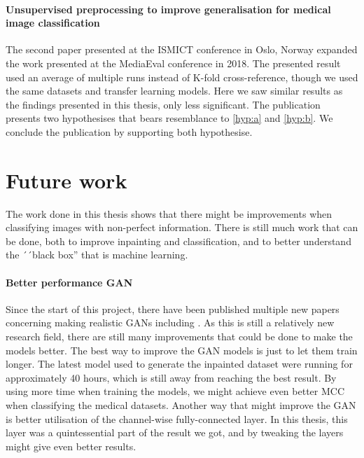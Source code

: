 \paragraph{Unsupervised preprocessing to improve generalisation for medical image classification~\cite{Mathias2019IEEpaper}}
The second paper presented at the ISMICT conference in Oslo, Norway expanded the work presented at the MediaEval conference in 2018.
The presented result used an average of multiple runs instead of K-fold cross-reference, though we used the same datasets and transfer learning models.
Here we saw similar results as the findings presented in this thesis, only less significant. The publication presents two hypothesises that bears resemblance to \ref{hyp:a} and \ref{hyp:b}. We conclude the publication by supporting both hypothesise.








\section{Future work}
The work done in this thesis shows that there might be improvements when classifying images with non-perfect information. There is still much work that can be done, both to improve inpainting and classification, and to better understand the ´´black box'' that is machine learning. 

\paragraph{Better performance GAN}
Since the start of this project, there have been published multiple new papers concerning making realistic GANs including \cite{DBLP:journals/corr/abs-1809-11096} \cite{DBLP:journals/corr/abs-1812-04948}. As this is still a relatively new research field, there are still many improvements that could be done to make the models better.
The best way to improve the GAN models is just to let them train longer. The latest model used to generate the inpainted dataset were running for approximately 40 hours, which is still away from reaching the best result. By using more time when training the models, we might achieve even better MCC when classifying the medical datasets.
Another way that might improve the GAN is better utilisation of the channel-wise fully-connected layer. In this thesis, this layer was a quintessential part of the result we got, and by tweaking the layers might give even better results.

